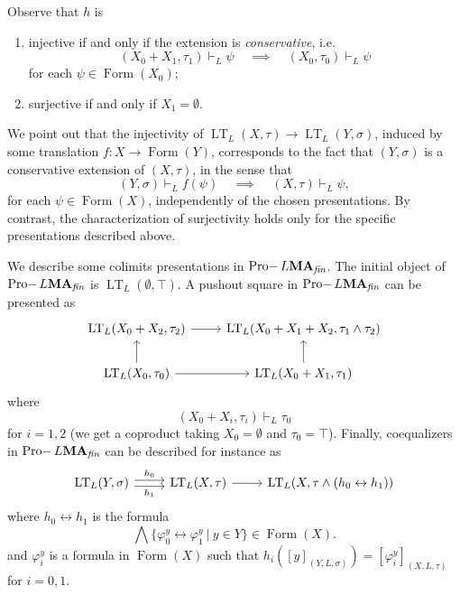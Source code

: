 \documentclass{article}
\theoremstyle{definition}
\DeclareMathOperator{\LT}{LT}
\DeclareMathOperator{\Formulas}{Form}
\DeclareMathOperator{\Pro}{Pro-}
\newcommand{\MA}{\textup{\textbf{MA}}}
\newcommand{\fin}{\textit{fin}}
\begin{document}
Observe that $h$ is
\begin{enumerate}
    \item injective if and only if the extension is \emph{conservative}, i.e.\
    $$(X_0+X_1,\tau_1) \vdash_L \psi ~~~~~\implies~~~~~ (X_0, \tau_0) \vdash_L \psi$$
    for each $\psi \in \Formulas(X_0)$;%
    \item surjective if and only if $X_1 = \emptyset$.
\end{enumerate}
We point out that the injectivity of $\LT_L(X,\tau) \longrightarrow \LT_L(Y,\sigma)$, induced by some translation $f \colon X \longrightarrow \Formulas(Y)$, corresponds to the fact that $(Y,\sigma)$ is a conservative extension of $(X,\tau)$, in the sense that
$$(Y,\sigma) \vdash_L f(\psi) ~~~~~\implies~~~~~ (X,\tau) \vdash_L \psi,$$
for each $\psi \in \Formulas(X)$, independently of the chosen presentations. By contrast, the characterization of surjectivity holds only for the specific presentations described above.

We describe some colimits presentations  in $\Pro L\MA_\fin$. The initial object of $\Pro L\MA_\fin$ is $\LT_L(\emptyset,\top)$. 
A pushout square in $\Pro L\MA_\fin$ can be presented as
\[\begin{tikzcd}[ampersand replacement=\&]
	{\LT_L(X_0 + X_2,\tau_2)} \& {\LT_L(X_0 + X_1 + X_2,\tau_1 \wedge \tau_2)} \\
	{\LT_L(X_0,\tau_0)} \& {\LT_L(X_0 + X_1,\tau_1)}
	\arrow[from=1-1, to=1-2]
	\arrow[from=2-1, to=1-1]
	\arrow[from=2-1, to=2-2]
	\arrow[from=2-2, to=1-2]
\end{tikzcd}\]
where
$$(X_0+X_i,\tau_i) \vdash_L \tau_0$$
for $i = 1, 2$ (we get a coproduct taking $X_0 = \emptyset$ and $\tau_0 = \top$). Finally, coequalizers in $\Pro L\MA_\fin$ can be described for instance as
\[\begin{tikzcd}[ampersand replacement=\&]
	{\LT_L(Y,\sigma)} \& {\LT_L(X,\tau)} \& {\LT_L(X,\tau \wedge (h_0 \leftrightarrow h_1))}
	\arrow["h_0", shift left, from=1-1, to=1-2]
	\arrow["h_1"', shift right, from=1-1, to=1-2]
	\arrow[from=1-2, to=1-3]
\end{tikzcd}\]
where $h_0 \leftrightarrow h_1$ is the formula
$$\bigwedge\{\varphi_0^y \leftrightarrow \varphi_1^y\ \vert\ y \in Y\} \in \Formulas(X).$$
and $\varphi_i^y$ is a formula in $\Formulas(X)$ such that $h_i([y]_{(Y,L,\sigma)}) = [\varphi_i^y]_{(X,L,\tau)}$ for $i = 0, 1$.
\end{document}
